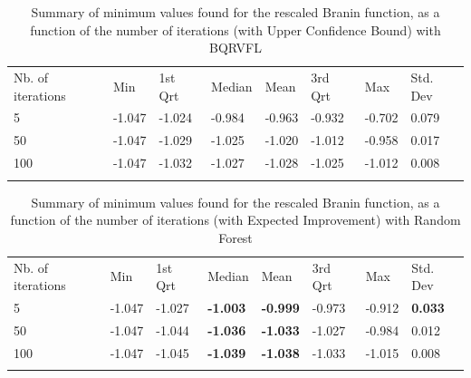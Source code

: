 \begin{table}[!htb]
\begin{center}
\caption{Summary of minimum values found for the rescaled Branin function, as a function of the number of iterations (with Upper Confidence Bound) with BQRVFL}
\label{tab:min_values_bqrvfl_ucb}       %
\begin{tabular}{llllllll}
\hline\noalign{\smallskip}
Nb. of iterations & Min & 1st Qrt  & Median & Mean  & 3rd Qrt  & Max & Std. Dev \\
\noalign{\smallskip}\hline\noalign{\smallskip}
  5   & -1.047 & -1.024 & -0.984 & -0.963 & -0.932 & -0.702 & 0.079  \\
  50  & -1.047 & -1.029 & -1.025 & -1.020 & -1.012 & -0.958 & 0.017 \\
  100 & -1.047 & -1.032 & -1.027 & -1.028 & -1.025 & -1.012 & 0.008 \\
\noalign{\smallskip}\hline
\end{tabular}
\end{center}
\end{table}

\begin{table}[!htb]
\begin{center}
\caption{Summary of minimum values found for the rescaled Branin function, as a function of the number of iterations (with Expected Improvement) with Random Forest}
\label{tab:min_values_rf_ei}       %
\begin{tabular}{llllllll}
\hline\noalign{\smallskip}
Nb. of iterations & Min & 1st Qrt  & Median & Mean  & 3rd Qrt  & Max & Std. Dev \\
\noalign{\smallskip}\hline\noalign{\smallskip}
  5   & -1.047 & -1.027 & \textbf{-1.003} & \textbf{-0.999} & -0.973 & -0.912 & \textbf{0.033} \\
  50  & -1.047 & -1.044 & \textbf{-1.036} & \textbf{-1.033} & -1.027 & -0.984 & 0.012 \\
  100 & -1.047 & -1.045 & \textbf{-1.039} & \textbf{-1.038} & -1.033 & -1.015 & 0.008 \\
\noalign{\smallskip}\hline
\end{tabular}
\end{center}
\end{table}

